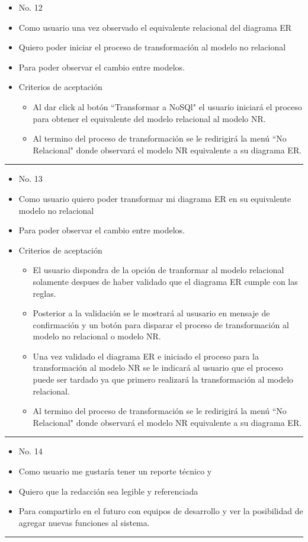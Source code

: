 \begin{itemize}
	\item No. 12
	\item Como usuario una vez observado el equivalente relacional del diagrama ER
	\item Quiero poder iniciar el proceso de transformación al modelo no relacional
	\item Para poder observar el cambio entre modelos.
	\item Criterios de aceptación
	\begin{itemize}
		\item Al dar click al botón ``Transformar a NoSQl" el usuario iniciará el proceso para obtener el equivalente del modelo relacional al modelo NR.
		\item Al termino del proceso de transformación se le redirigirá la menú ``No Relacional" donde observará el modelo NR equivalente a su diagrama ER.
	\end{itemize}
\end{itemize}
\noindent\rule{\textwidth}{1pt}
\begin{itemize}
	\item No. 13
	\item Como usuario quiero poder transformar mi diagrama ER en su equivalente modelo no relacional
	\item Para poder observar el cambio entre modelos.
	\item Criterios de aceptación
	\begin{itemize}
		\item El usuario dispondra de la opción de tranformar al modelo relacional solamente despues de haber validado que el diagrama ER cumple con las reglas.
		\item Posterior a la validación se le mostrará al ususario en mensaje de confirmación y un botón para disparar el proceso de transformación al modelo no relacional o modelo NR.
		\item Una vez validado el diagrama ER e iniciado el proceso para la transformación al modelo NR se le indicará al usuario que el proceso puede ser tardado ya que primero realizará la transformación al modelo relacional.
		\item Al termino del proceso de transformación se le redirigirá la menú ``No Relacional" donde observará el modelo NR equivalente a su diagrama ER.
	\end{itemize}
\end{itemize}
\noindent\rule{\textwidth}{1pt}
\begin{itemize}
	\item No. 14
	\item Como usuario me gustaría tener un reporte técnico y
	\item Quiero que la redacción sea legible y referenciada
	\item Para compartirlo en el futuro con equipos de desarrollo y ver la posibilidad de agregar nuevas funciones al sistema.
\end{itemize}
\noindent\rule{\textwidth}{1pt}




